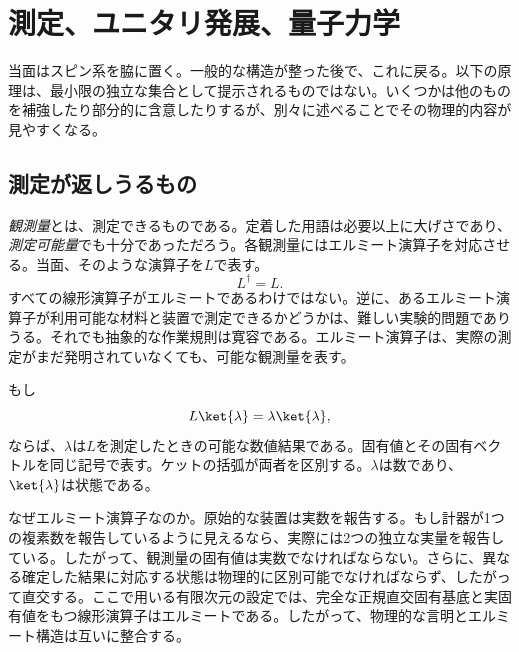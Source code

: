 \chapter{測定、ユニタリ発展、量子力学}


当面はスピン系を脇に置く。一般的な構造が整った後で、これに戻る。以下の原理は、最小限の独立な集合として提示されるものではない。いくつかは他のものを補強したり部分的に含意したりするが、別々に述べることでその物理的内容が見やすくなる。

\section{測定が返しうるもの}

\emph{観測量}とは、測定できるものである。定着した用語は必要以上に大げさであり、\emph{測定可能量}でも十分であっただろう。各観測量にはエルミート演算子を対応させる。当面、そのような演算子を\(L\)で表す。
\begin{equation}
L^\dagger=L.
\end{equation}
すべての線形演算子がエルミートであるわけではない。逆に、あるエルミート演算子が利用可能な材料と装置で測定できるかどうかは、難しい実験的問題でありうる。それでも抽象的な作業規則は寛容である。エルミート演算子は、実際の測定がまだ発明されていなくても、可能な観測量を表す。

もし
\begin{equation}
L\ket{\lambda}=\lambda\ket{\lambda},
\end{equation}
ならば、\(\lambda\)は\(L\)を測定したときの可能な数値結果である。固有値とその固有ベクトルを同じ記号で表す。ケットの括弧が両者を区別する。\(\lambda\)は数であり、\(\ket{\lambda}\)は状態である。

なぜエルミート演算子なのか。原始的な装置は実数を報告する。もし計器が1つの複素数を報告しているように見えるなら、実際には2つの独立な実量を報告している。したがって、観測量の固有値は実数でなければならない。さらに、異なる確定した結果に対応する状態は物理的に区別可能でなければならず、したがって直交する。ここで用いる有限次元の設定では、完全な正規直交固有基底と実固有値をもつ線形演算子はエルミートである。したがって、物理的な言明とエルミート構造は互いに整合する。

